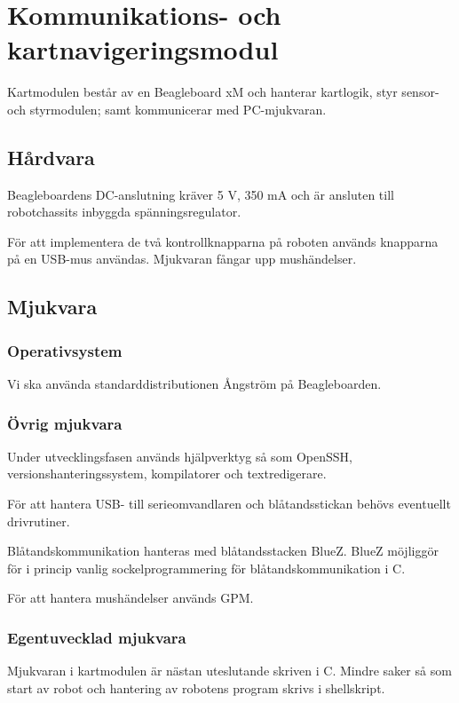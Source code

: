 \section{Kommunikations- och kartnavigeringsmodul}

Kartmodulen består av en Beagleboard xM och hanterar kartlogik, styr sensor-
och styrmodulen; samt kommunicerar med PC-mjukvaran.

\subsection{Hårdvara}
Beagleboardens DC-anslutning kräver 5 V, 350 mA och är ansluten till
robotchassits inbyggda spänningsregulator.

För att implementera de två kontrollknapparna på roboten används knapparna på
en USB-mus användas. Mjukvaran fångar upp mushändelser. 

\subsection{Mjukvara}

\subsubsection{Operativsystem}

Vi ska använda standarddistributionen Ångström på Beagleboarden.

\subsubsection{Övrig mjukvara}

Under utvecklingsfasen används hjälpverktyg så som OpenSSH,
versionshanteringssystem, kompilatorer och textredigerare.

För att hantera USB- till serieomvandlaren och blåtandsstickan behövs
eventuellt drivrutiner.

Blåtandskommunikation hanteras med blåtandsstacken BlueZ. BlueZ möjliggör
för i princip vanlig sockelprogrammering för blåtandskommunikation i C.

För att hantera mushändelser används GPM.

\subsubsection{Egentuvecklad mjukvara}
Mjukvaran i kartmodulen är nästan uteslutande skriven i C. Mindre saker så som
start av robot och hantering av robotens program skrivs i shellskript.

